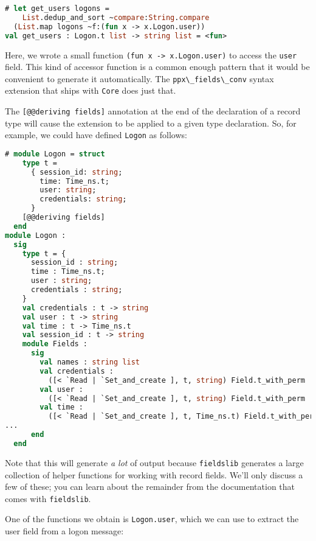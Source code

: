 \begin{lstlisting}[language=Caml]
# let get_users logons =
    List.dedup_and_sort ~compare:String.compare
  (List.map logons ~f:(fun x -> x.Logon.user))
val get_users : Logon.t list -> string list = <fun>
\end{lstlisting}

Here, we wrote a small function
\passthrough{\lstinline!(fun x -> x.Logon.user)!} to access the
\passthrough{\lstinline!user!} field. This kind of accessor function is
a common enough pattern that it would be convenient to generate it
automatically. The \passthrough{\lstinline!ppx\_fields\_conv!} syntax
extension that ships with \passthrough{\lstinline!Core!} does just
that.

The \passthrough{\lstinline![@@deriving fields]!} annotation at the end
of the declaration of a record type will cause the extension to be
applied to a given type declaration. So, for example, we could have
defined \passthrough{\lstinline!Logon!} as follows:

\begin{lstlisting}[language=Caml]
# module Logon = struct
    type t =
      { session_id: string;
        time: Time_ns.t;
        user: string;
        credentials: string;
      }
    [@@deriving fields]
  end
module Logon :
  sig
    type t = {
      session_id : string;
      time : Time_ns.t;
      user : string;
      credentials : string;
    }
    val credentials : t -> string
    val user : t -> string
    val time : t -> Time_ns.t
    val session_id : t -> string
    module Fields :
      sig
        val names : string list
        val credentials :
          ([< `Read | `Set_and_create ], t, string) Field.t_with_perm
        val user :
          ([< `Read | `Set_and_create ], t, string) Field.t_with_perm
        val time :
          ([< `Read | `Set_and_create ], t, Time_ns.t) Field.t_with_perm
...
      end
  end
\end{lstlisting}

Note that this will generate \emph{a lot} of output because
\passthrough{\lstinline!fieldslib!} generates a large collection of
helper functions for working with record fields. We'll only discuss a
few of these; you can learn about the remainder from the documentation
that comes with \passthrough{\lstinline!fieldslib!}.

One of the functions we obtain is \passthrough{\lstinline!Logon.user!},
which we can use to extract the user field from a logon message:

